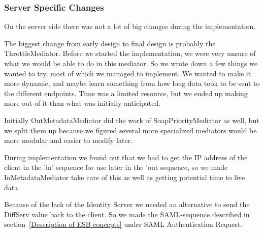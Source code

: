 \subsubsection{Server Specific Changes}\label{Changes:Server}
    On the server side there was not a lot of big changes during the implementation.
    
    The biggest change from early design to final design is probably the ThrottleMediator. Before we started the implementation, we were very unsure of what we would be able to do in this mediator. So we wrote down a few things we wanted to try, most of which we managed to implement. We wanted to make it more dynamic, and maybe learn something from how long data took to be sent to the different endpoints. Time was a limited resource, but we ended up making more out of it than what was initially anticipated.

    Initially OutMetadataMediator did the work of SoapPriorityMediator as well, but we split them up because we figured several more specialized mediators would be more modular and easier to modify later.

    During implementation we found out that we had to get the IP address of the client in the 'in' sequence for use later in the 'out sequence, so we made InMetadataMediator take care of this as well as getting potential time to live data.

    Because of the lack of the Identity Server we needed an alternative to send the DiffServ value back to the client. So we made the SAML-sequence described in section~\ref{Description of ESB concepts} under SAML Authentication Request.
